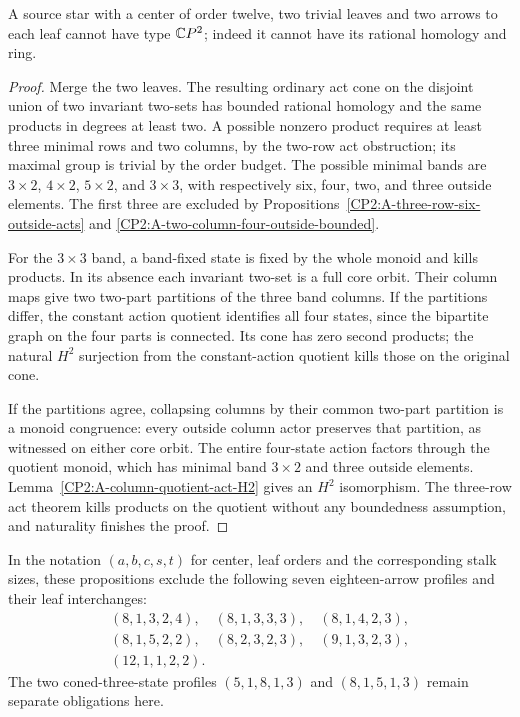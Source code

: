 \begin{proposition}
\label{CP2:A-star-twelve-binary-leaves}
A source star with a center of order twelve, two trivial
leaves and two arrows to each leaf cannot have type
$\mathbb{C}P^2$; indeed it cannot have its rational homology and ring.
\end{proposition}
\begin{proof}
Merge the two leaves. The resulting ordinary act cone
on the disjoint union of two invariant two-sets has
bounded rational homology and the same products in
degrees at least two. A possible nonzero product requires
at least three minimal rows and two columns, by the
two-row act obstruction; its maximal group is trivial
by the order budget. The possible minimal bands are
$3\times2$, $4\times2$, $5\times2$, and $3\times3$,
with respectively six, four, two, and three outside
elements. The first three are excluded by
Propositions~\ref{CP2:A-three-row-six-outside-acts} and
\ref{CP2:A-two-column-four-outside-bounded}.

For the $3\times3$ band, a band-fixed state is fixed by
the whole monoid and kills products. In its absence
each invariant two-set is a full core orbit. Their
column maps give two two-part partitions of the three
band columns. If the partitions differ, the constant
action quotient identifies all four states, since
the bipartite graph on the four parts is connected.
Its cone has zero second products; the natural $H^2$
surjection from the constant-action quotient kills
those on the original cone.

If the partitions agree, collapsing columns by their
common two-part partition is a monoid congruence:
every outside column actor preserves that partition,
as witnessed on either core orbit. The entire four-state
action factors through the quotient monoid, which has
minimal band $3\times2$ and three outside elements.
Lemma~\ref{CP2:A-column-quotient-act-H2} gives an $H^2$
isomorphism. The three-row act theorem kills products
on the quotient without any boundedness assumption,
and naturality finishes the proof.
\end{proof}

\begin{remark*}
In the notation $(a,b,c,s,t)$ for center, leaf orders and
the corresponding stalk sizes, these propositions exclude
the following seven eighteen-arrow profiles and their
leaf interchanges:
\[
\begin{gathered}
 (8,1,3,2,4),\quad(8,1,3,3,3),\quad(8,1,4,2,3),\\
 (8,1,5,2,2),\quad(8,2,3,2,3),\quad(9,1,3,2,3),\\
 (12,1,1,2,2).
\end{gathered}
\]
The two coned-three-state profiles $(5,1,8,1,3)$ and
$(8,1,5,1,3)$ remain separate obligations here.
\end{remark*}
